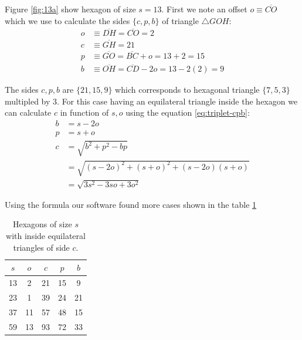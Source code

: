 \documentclass[11pt]{article}
\begin{document}
Figure \ref{fig:13a} show hexagon of size $s = 13$. First we note an offset $o \equiv \overline{CO}$ which we use to calculate the sides $\{c,p,b\}$ of triangle $\triangle{GOH}$:
\begin{align}
o &\equiv \overline{DH} = \overline{CO} = 2 \nonumber\\
c &\equiv \overline{GH} = 21 \nonumber\\
p &\equiv \overline{GO} = \overline{BC} + o = 13+2 = 15 \nonumber\\
b &\equiv \overline{OH} = \overline{CD} - 2o = 13 - 2(2) = 9
\end{align}

The sides $c,p,b$ are $\{21,15,9\}$ which corresponds to hexagonal triangle $\{7,5,3\}$ multipled by $3$. For this case having an equilateral triangle inside the hexagon we can calculate $c$ in function of $s,o$ using the equation \ref{eq:triplet-cpb}:
\begin{align}
b &= s - 2o \nonumber\\
p &= s + o \nonumber\\
c &= \sqrt{b^2 + p^2 - bp} \nonumber\\
   &= \sqrt{(s - 2o)^2 + (s+o)^2 + (s - 2o)(s+o)} \nonumber\\
   &= \sqrt{3s^2 - 3so + 3o^2}
\end{align}

Using the formula our software found more cases shown in the table \ref{tbl:eqtriangles}
\begin{table}[H]
\begin{center}
\begin{tabular}{| c c | c c c |} 
 \hline
 $s$ & $o$ & $c$ & $p$ & $b$ \\ [0.5ex] 
 \hline\hline
  13 &  2 &  21 &  15 &  9 \\ \hline
  23 &  1 &  39 &  24 & 21 \\ \hline
  37 & 11 &  57 &  48 & 15 \\ \hline
  59 & 13 &  93 &  72 & 33 \\ \hline
\end{tabular}
\caption{Hexagons of size $s$ with inside equilateral triangles of side $c$.}
\label{tbl:eqtriangles}
\end{center}
\end{table}
\end{document}
